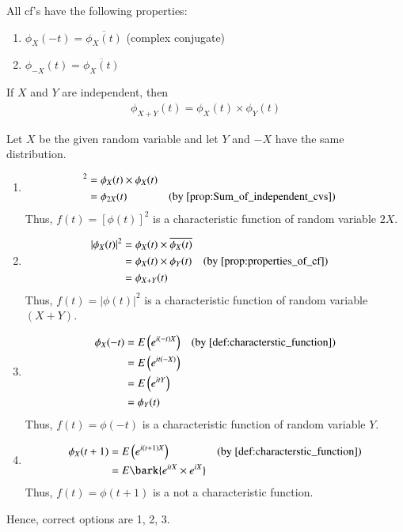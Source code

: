 \documentclass[journal,12pt,twocolumn]{IEEEtran}
\begin{document}
\begin{proposition}
All cf’s have the following properties:\\
\begin{enumerate}
    \item $\phi_X(-t) =\overline{\phi_X(t)}$ (complex conjugate)
    \item  $\phi_{-X}(t) = \overline{\phi_X(t)}$  
\end{enumerate}
\label{prop:properties_of_cf}
\end{proposition}
\begin{proposition}
 If $X$ and $Y$ are independent, then
 \begin{align*}
     \phi_{X+Y}(t) = \phi_X(t)\times\phi_Y(t)
 \end{align*}
 \label{prop:Sum_of_independent_cvs}
\end{proposition}
Let $X$ be the given random variable and let $Y$  and $-X$ have the same distribution.
\begin{enumerate}
    \item \begin{align*} [\phi_X(t)]^2 &= \phi_X(t)\times\phi_X(t) \\
                &= \phi_{2X}(t) & & \text{(by  \cref{prop:Sum_of_independent_cvs})}
\end{align*}
Thus, $f(t) = [\phi(t)]^2$ is a characteristic function of random variable $2X$.

\item \begin{align*} |\phi_X(t)|^2 &= \phi_X(t)\times\overline{\phi_X(t)} \\
                &= \phi_X(t)\times\phi_Y(t) & & \text{(by  \cref{prop:properties_of_cf})}\\
                &= \phi_{X+Y}(t)
\end{align*}
Thus, $f(t)=|\phi(t)|^2$ is a characteristic function of random variable $(X+Y)$.\\

\item \begin{align*} \phi_X(-t) &= E\brak{e^{i(-t)X}} & & \text{(by  \cref{def:characterstic_function})} \\
                &= E\brak{e^{it(-X)}} \\
                &= E\brak{e^{itY}}\\
                &= \phi_Y(t)
\end{align*}
Thus, $f(t) = \phi(-t)$ is a characteristic function of random variable $Y$.

\item \begin{align*} \phi_X(t+1) &= E\brak{e^{i(t+1)X}}  & & \text{(by  \cref{def:characterstic_function})} \\
&= E\bark{e^{itX}\times e^{iX}} 
\end{align*}
Thus, $f(t) = \phi(t+1)$ is a not a characteristic function.\\
\end{enumerate}


Hence, correct options are 1, 2, 3.
\end{document}
